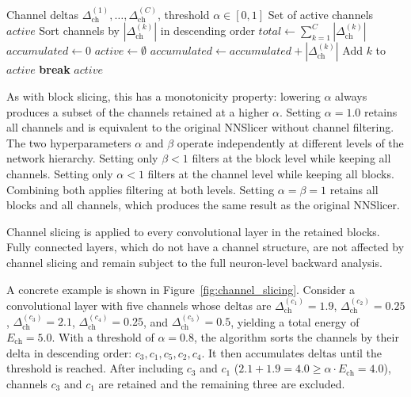 \documentclass[
12pt,
fancyheadings,
a4paper,
twoside,
BCOR=0.7cm,
nobcorignoretitle,
grayscalebody,
]{stsreprt}
\begin{document}
\begin{algorithm}[ht]
\caption{ChannelSlice: identifying channels to skip}\label{alg:channel_slicing}
\begin{algorithmic}[1]
\Require Channel deltas $\Delta_{\text{ch}}^{(1)}, \dots, \Delta_{\text{ch}}^{(C)}$, threshold $\alpha \in [0, 1]$
\Ensure Set of active channels $\textit{active}$
\State Sort channels by $|\Delta_{\text{ch}}^{(k)}|$ in descending order
\State $\textit{total} \gets \sum_{k=1}^{C} |\Delta_{\text{ch}}^{(k)}|$
\State $\textit{accumulated} \gets 0$
\State $\textit{active} \gets \emptyset$
    \State $\textit{accumulated} \gets \textit{accumulated} + |\Delta_{\text{ch}}^{(k)}|$
    \State Add $k$ to $\textit{active}$
        \State \textbf{break}
    \EndIf
\EndFor
\State \Return $\textit{active}$
\end{algorithmic}
\end{algorithm}

As with block slicing, this has a monotonicity property: lowering $\alpha$ always produces a subset
of the channels retained at a higher $\alpha$.
Setting $\alpha = 1.0$ retains all channels and is equivalent to the original NNSlicer without
channel filtering.
The two hyperparameters $\alpha$ and $\beta$ operate independently at different levels of the
network hierarchy.
Setting only $\beta < 1$ filters at the block level while keeping all channels.
Setting only $\alpha < 1$ filters at the channel level while keeping all blocks.
Combining both applies filtering at both levels.
Setting $\alpha = \beta = 1$ retains all blocks and all channels, which produces the same result as
the original NNSlicer.

Channel slicing is applied to every convolutional layer in the retained blocks.
Fully connected layers, which do not have a channel structure, are not affected by channel slicing
and remain subject to the full neuron-level backward analysis.

A concrete example is shown in Figure~\ref{fig:channel_slicing}.
Consider a convolutional layer with five channels whose deltas are $\Delta_{\text{ch}}^{(c_1)} =
1.9$, $\Delta_{\text{ch}}^{(c_2)} = 0.25$, $\Delta_{\text{ch}}^{(c_3)} = 2.1$,
$\Delta_{\text{ch}}^{(c_4)} = 0.25$, and $\Delta_{\text{ch}}^{(c_5)} = 0.5$, yielding a total
energy of $E_{\text{ch}} = 5.0$.
With a threshold of $\alpha = 0.8$, the algorithm sorts the channels by their delta in descending
order: $c_3, c_1, c_5, c_2, c_4$.
It then accumulates deltas until the threshold is reached. After including $c_3$ and $c_1$ ($2.1 +
1.9 = 4.0 \geq \alpha \cdot E_{\text{ch}} = 4.0$), channels $c_3$ and $c_1$ are retained and the
remaining three are excluded.
\end{document}
